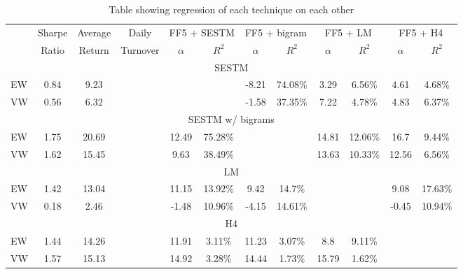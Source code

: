 \begin{table}[!t]
\begin{center}
\begin{tabular}{lccccccccccc}
      \toprule
      & Sharpe &  Average & Daily & \multicolumn{2}{c}{FF5 + SESTM} & \multicolumn{2}{c}{FF5 + bigram} & \multicolumn{2}{c}{FF5 + LM} & \multicolumn{2}{c}{FF5 + H4}\\
      \cmidrule(lr){5-6}
      \cmidrule(lr){7-8}
      \cmidrule(lr){9-10}
      \cmidrule(lr){11-12}
       & Ratio & Return & Turnover & $\alpha$ & $R^2$ & $\alpha$ & $R^2$ & $\alpha$ & $R^2$ & $\alpha$ & $R^2$ \\
      \midrule
      \multicolumn{12}{c}{SESTM} \\
EW & 0.84 & 9.23 & & & & -8.21 & 74.08\% & 3.29 & 6.56\% & 4.61 & 4.68\%\\
VW & 0.56 & 6.32 & & & & -1.58 & 37.35\% & 7.22 & 4.78\% & 4.83 & 6.37\%\\
   \multicolumn{12}{c}{SESTM w/ bigrams} \\
EW & 1.75 & 20.69 & & 12.49 & 75.28\% & & & 14.81 & 12.06\% & 16.7 & 9.44\%\\
VW & 1.62 & 15.45 & & 9.63 & 38.49\% & & & 13.63 & 10.33\% & 12.56 & 6.56\%\\
   \multicolumn{12}{c}{LM} \\
EW & 1.42 & 13.04 & & 11.15 & 13.92\% & 9.42 & 14.7\% & & & 9.08 & 17.63\%\\
VW & 0.18 & 2.46 & & -1.48 & 10.96\% & -4.15 & 14.61\% & & & -0.45 & 10.94\%\\
   \multicolumn{12}{c}{H4} \\
EW & 1.44 & 14.26 & & 11.91 & 3.11\% & 11.23 & 3.07\% & 8.8 & 9.11\% & &  \\
VW & 1.57 & 15.13 & & 14.92 & 3.28\% & 14.44 & 1.73\% & 15.79 & 1.62\% & &  \\
      \bottomrule
\end{tabular}
\caption{Table showing regression of each technique on each other}
\label{tab:regression-comparisons}
\end{center}
\end{table}

